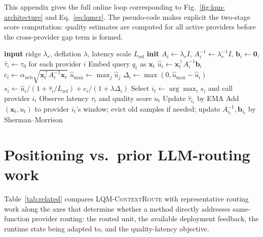 \documentclass[11pt]{article}
\newcommand{\lqmcr}{\textsc{LQM-ContextRoute}}
\begin{document}
This appendix gives the full online loop corresponding to Fig.~\ref{fig:lqm-architecture} and Eq.~\ref{eq:lqmcr}. The pseudo-code makes explicit the two-stage score computation: quality estimates are computed for all active providers before the cross-provider gap term is formed.

\begin{algorithm}[H]
\caption{\lqmcr{} online routing}
\label{alg:lqmcontextroute}
\small
\begin{algorithmic}[1]
\State \textbf{input} ridge $\lambda_r$, deflation $\lambda$, latency scale $L_{\text{ref}}$
\State \textbf{init} $A_i \gets \lambda_r I$, $A_i^{-1}\gets \lambda_r^{-1}I$,
$\mathbf{b}_i \gets \mathbf{0}$, $\hat{\tau}_i \gets \tau_0$ for each provider $i$
  \State Embed query $q_t$ as $\mathbf{x}_t$
    \State $\hat{u}_i \gets \mathbf{x}_t^\top A_i^{-1}\mathbf{b}_i$
    \State $c_i \gets \alpha_{\text{ucb}}
      \sqrt{\mathbf{x}_t^\top A_i^{-1}\mathbf{x}_t}$
  \EndFor
  \State $\hat{u}_{\max}\gets \max_j \hat{u}_j$
    \State $\Delta_i \gets \max(0,\hat{u}_{\max}-\hat{u}_i)$
    \State $s_i \gets
      \hat{u}_i/(1+\hat{\tau}_i/L_{\text{ref}})
      + c_i/(1+\lambda\Delta_i)$
  \EndFor
  \State Select $i_t \gets \arg\max_i s_i$ and call provider $i_t$
  \State Observe latency $\tau_t$ and quality score $u_t$
  \State Update $\hat{\tau}_{i_t}$ by EMA
  \State Add $(\mathbf{x}_t,u_t)$ to provider $i_t$'s window; evict old
  samples if needed; update $A_{i_t}^{-1},\mathbf{b}_{i_t}$ by
  Sherman--Morrison
\EndFor
\end{algorithmic}
\end{algorithm}

\section{Positioning vs.\ prior LLM-routing work}
\label{app:positioning}

Table~\ref{tab:related} compares \lqmcr{} with representative routing work along the axes that determine whether a method directly addresses same-function provider routing: the routed unit, the available deployment feedback, the runtime state being adapted to, and the quality-latency objective.
\end{document}
